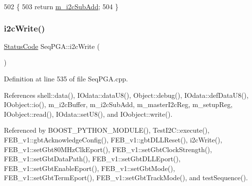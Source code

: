 \begin{DoxyCode}
502                                    \{
503   \textcolor{keywordflow}{return} \hyperlink{classSeqPGA_a82bda98edb9681aff47733e83ac8bc4f}{m\_i2cSubAdd}; 
504 \}
\end{DoxyCode}
\mbox{\label{classSeqPGA_a429076ca3a4ece94182bd95c623bb9d0}} 
\subsubsection{\texorpdfstring{i2c\+Write()}{i2cWrite()}\hspace{0.1cm}{\footnotesize\ttfamily [1/2]}}
{\footnotesize\ttfamily \hyperlink{classStatusCode}{Status\+Code} Seq\+P\+G\+A\+::i2c\+Write (\begin{DoxyParamCaption}{ }\end{DoxyParamCaption})}



Definition at line 535 of file Seq\+P\+G\+A.\+cpp.



References shell\+::data(), I\+Odata\+::data\+U8(), Object\+::debug(), I\+Odata\+::def\+Data\+U8(), I\+Oobject\+::io(), m\+\_\+i2c\+Buffer, m\+\_\+i2c\+Sub\+Add, m\+\_\+master\+I2c\+Reg, m\+\_\+setup\+Reg, I\+Oobject\+::read(), I\+Odata\+::set\+U8(), and I\+Oobject\+::write().



Referenced by B\+O\+O\+S\+T\+\_\+\+P\+Y\+T\+H\+O\+N\+\_\+\+M\+O\+D\+U\+L\+E(), Test\+I2\+C\+::execute(), F\+E\+B\+\_\+v1\+::gbt\+Acknowledge\+Config(), F\+E\+B\+\_\+v1\+::gbt\+D\+L\+L\+Reset(), i2c\+Write(), F\+E\+B\+\_\+v1\+::set\+Gbt80\+M\+Hz\+Clk\+Eport(), F\+E\+B\+\_\+v1\+::set\+Gbt\+Clock\+Strength(), F\+E\+B\+\_\+v1\+::set\+Gbt\+Data\+Path(), F\+E\+B\+\_\+v1\+::set\+Gbt\+D\+L\+L\+Eport(), F\+E\+B\+\_\+v1\+::set\+Gbt\+Enable\+Eport(), F\+E\+B\+\_\+v1\+::set\+Gbt\+Mode(), F\+E\+B\+\_\+v1\+::set\+Gbt\+Term\+Eport(), F\+E\+B\+\_\+v1\+::set\+Gbt\+Track\+Mode(), and test\+Sequence().


